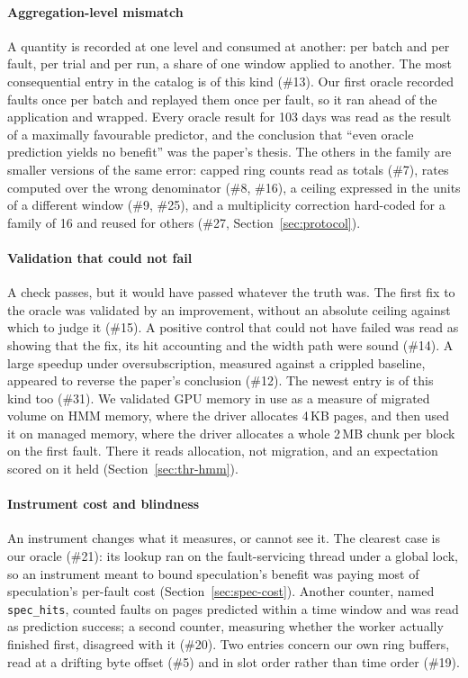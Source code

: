 \paragraph{Aggregation-level mismatch}
A quantity is recorded at one level and consumed at another: per batch and
per fault, per trial and per run, a share of one window applied to another. The
most consequential entry in the catalog is of this kind (\#13). Our first
oracle recorded faults once per batch and replayed them once per fault, so it
ran ahead of the application and wrapped. Every oracle result for 103 days was
read as the result of a maximally favourable predictor, and the conclusion
that ``even oracle prediction yields no benefit'' was the paper's thesis. The
others in the family are smaller versions of the same error: capped ring
counts read as totals (\#7), rates computed over the wrong denominator (\#8,
\#16), a ceiling expressed in the units of a different window (\#9, \#25), and
a multiplicity correction hard-coded for a family of 16 and reused for others
(\#27, Section~\ref{sec:protocol}).

\paragraph{Validation that could not fail}
A check passes, but it would have passed whatever the truth was. The first
fix to the oracle was validated by an improvement, without an absolute
ceiling against which to judge it (\#15). A positive control that could not have
failed was read as showing that the fix, its hit accounting and the width path
were sound (\#14). A large speedup under oversubscription,
measured against a crippled baseline, appeared to reverse the paper's
conclusion (\#12). The newest entry is
of this kind too (\#31). We validated GPU memory in use as a measure of
migrated volume on HMM memory, where the driver allocates 4\,KB pages, and then
used it on managed memory, where the driver allocates a whole 2\,MB chunk per
block on the first fault. There it reads allocation, not migration, and an
expectation scored on it held (Section~\ref{sec:thr-hmm}).

\paragraph{Instrument cost and blindness}
An instrument changes what it measures, or cannot see it. The clearest case is
our oracle (\#21): its lookup ran on the fault-servicing thread under a global
lock, so an instrument meant to bound speculation's benefit was paying most of
speculation's per-fault cost (Section~\ref{sec:spec-cost}). Another counter,
named \texttt{spec\_hits}, counted faults on pages predicted within a time
window and was read as prediction success; a second counter, measuring whether
the worker actually finished first, disagreed with it (\#20). Two entries
concern our own ring buffers, read at a drifting byte offset (\#5) and in slot
order rather than time order (\#19).


